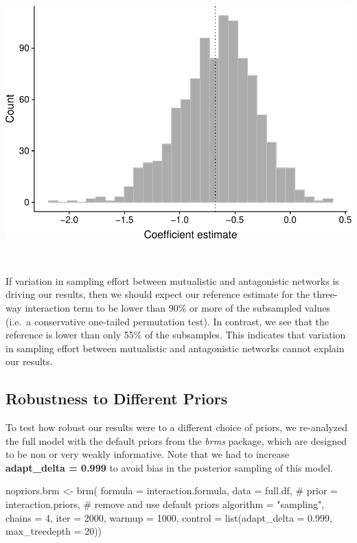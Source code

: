 \documentclass[11pt,]{article}
\newenvironment{Shaded}{}{}
\newcommand{\KeywordTok}[1]{\textcolor[rgb]{0.00,0.00,1.00}{#1}}
\newcommand{\DataTypeTok}[1]{#1}
\newcommand{\DecValTok}[1]{#1}
\newcommand{\FloatTok}[1]{#1}
\newcommand{\StringTok}[1]{\textcolor[rgb]{0.00,0.50,0.50}{#1}}
\newcommand{\CommentTok}[1]{\textcolor[rgb]{0.00,0.50,0.00}{#1}}
\newcommand{\NormalTok}[1]{#1}
\begin{document}
\includegraphics{reproduce_analyses_files/figure-latex/plot subsample of three-way term-1.pdf}

~

If variation in sampling effort between mutualistic and antagonistic
networks is driving our results, then we should expect our reference
estimate for the three-way interaction term to be lower than 90\% or
more of the subsampled values (i.e.~a conservative one-tailed
permutation test). In contrast, we see that the reference is lower than
only 55\% of the subsamples. This indicates that variation in sampling
effort between mutualistic and antagonistic networks cannot explain our
results.

\subsection{Robustness to Different
Priors}\label{robustness-to-different-priors}

To test how robust our results were to a different choice of priors, we
re-analyzed the full model with the default priors from the \emph{brms}
package, which are designed to be non or very weakly informative. Note
that we had to increase \textbf{adapt\_delta = 0.999} to avoid bias in
the posterior sampling of this model.

\begin{Shaded}
\begin{Highlighting}[]
\NormalTok{nopriors.brm <-}\StringTok{ }\KeywordTok{brm}\NormalTok{(}
  \DataTypeTok{formula =}\NormalTok{ interaction.formula, }\DataTypeTok{data =}\NormalTok{ full.df, }
  \CommentTok{# prior = interaction.priors, # remove and use default priors}
  \DataTypeTok{algorithm =} \StringTok{"sampling"}\NormalTok{, }\DataTypeTok{chains =} \DecValTok{4}\NormalTok{, }\DataTypeTok{iter =} \DecValTok{2000}\NormalTok{, }\DataTypeTok{warmup =} \DecValTok{1000}\NormalTok{, }
  \DataTypeTok{control =} \KeywordTok{list}\NormalTok{(}\DataTypeTok{adapt_delta =} \FloatTok{0.999}\NormalTok{, }\DataTypeTok{max_treedepth =} \DecValTok{20}\NormalTok{))}
\end{Highlighting}
\end{Shaded}
\end{document}
